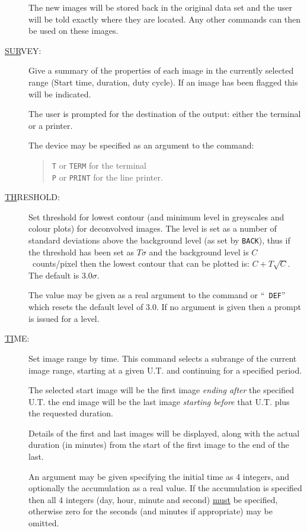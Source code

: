 \begin{description}
The new images will be stored back in the original data set and the
user will be told exactly where they are located. Any other commands
can then be used on these images.

\item[\underline{SUR}VEY: ] \label{sur}
Give a summary of the properties of each image in the currently
selected range (Start time, duration, duty cycle). If an image has been
flagged this will be indicated.

The user is prompted for the destination of the output: either the
terminal or a printer.

The device may be specified as an argument to the command:
\begin{quote}
{\tt T} or {\tt TERM} for the terminal\\ {\tt P} or {\tt PRINT} for the
line printer.
\end{quote}

\item[\underline{TH}RESHOLD: ] \label{th}
Set threshold for lowest contour (and minimum level in greyscales and
colour plots) for deconvolved images. The level is set as a number of
standard deviations above the background level (as set by {\tt BACK}),
thus if the threshold has been set as $T\sigma$ and the background
level is $C$~counts/pixel then the lowest contour that can be plotted
is: $ C + T \sqrt C $.  The default is 3.0$\sigma$.

The value may be given as a real argument to the command or ``{\tt
DEF}'' which resets the default level of 3.0. If no argument is given
then a prompt is issued for a level.

\item[\underline{TI}ME: ] \label{ti}
Set image range by time. This command selects a subrange of the current
image range, starting at a given U.T. and continuing for a specified
period.

The selected start image will be the first image {\em ending after} the
specified U.T. the end image will be the last image {\em starting
before} that U.T. plus the requested duration.

Details of the first and last images will be displayed, along with the
actual duration (in minutes) from the start of the first image to the
end of the last.

An argument may be given specifying the initial time as 4 integers, and
optionally the accumulation as a real value. If the accumulation is
specified then all 4 integers (day, hour, minute and second)
\underline{must} be specified, otherwise zero for the seconds (and
minutes if appropriate) may be omitted.


\end{description}
